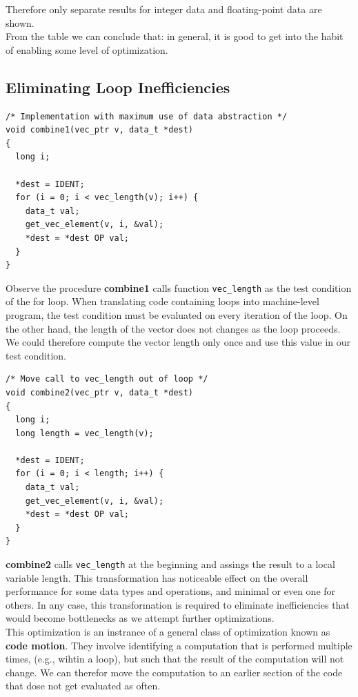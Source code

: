 \documentclass[11pt]{article}
\begin{document}
Therefore only separate results for integer data and floating-point data are shown.\\


From the table we can conclude that: in general, it is good to get into the habit of enabling some level of optimization.\\

\subsection{Eliminating Loop Inefficiencies}
\label{sec:org074b3a1}

\begin{verbatim}
/* Implementation with maximum use of data abstraction */
void combine1(vec_ptr v, data_t *dest)
{
  long i;

  *dest = IDENT;
  for (i = 0; i < vec_length(v); i++) {
    data_t val;
    get_vec_element(v, i, &val);
    *dest = *dest OP val;
  }
}

\end{verbatim}
Observe the procedure \textbf{combine1} calls function \texttt{vec\_length} as the test condition of the for loop. When translating code containing loops into machine-level program, the test condition must be evaluated on every iteration of the loop. On the other hand, the length of the vector does not changes as the loop proceeds. We could therefore compute the vector length only once and use this value in our test condition.\\

\begin{verbatim}
/* Move call to vec_length out of loop */
void combine2(vec_ptr v, data_t *dest)
{
  long i;
  long length = vec_length(v);

  *dest = IDENT;
  for (i = 0; i < length; i++) {
    data_t val;
    get_vec_element(v, i, &val);
    *dest = *dest OP val;
  }
}

\end{verbatim}
\textbf{combine2} calls \texttt{vec\_length} at the beginning and assings the result to a local variable length. This transformation has noticeable effect on the overall performance for some data types and operations, and minimal or even one for others. In any case, this transformation is required to eliminate inefficiencies that would become bottlenecks as we attempt further optimizations.\\

This optimization is an instrance of a general class of optimization known as \textbf{code motion}. They involve identifying a computation that is performed multiple times, (e.g., wihtin a loop), but such that the result of the computation will not change. We can therefor move the computation to an earlier section of the code that dose not get evaluated as often.\\
\end{document}
